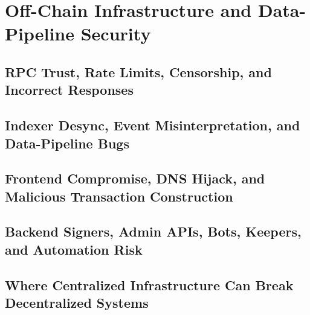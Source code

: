 \chapter{Off-Chain Infrastructure and Data-Pipeline Security}

\section{RPC Trust, Rate Limits, Censorship, and Incorrect Responses}

\section{Indexer Desync, Event Misinterpretation, and Data-Pipeline Bugs}

\section{Frontend Compromise, DNS Hijack, and Malicious Transaction Construction}

\section{Backend Signers, Admin APIs, Bots, Keepers, and Automation Risk}

\section{Where Centralized Infrastructure Can Break Decentralized Systems}
